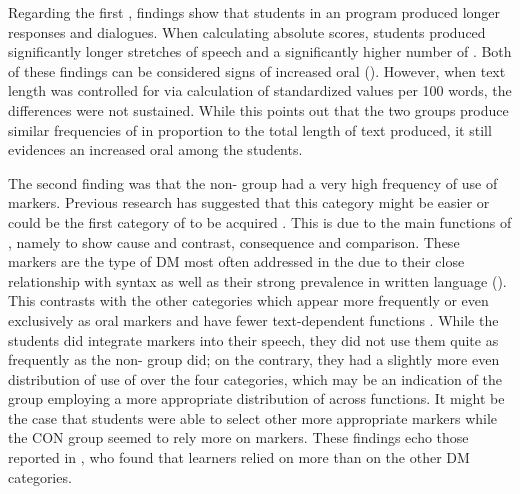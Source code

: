 \documentclass[output=paper]{langsci/langscibook}
\begin{document}
Regarding the first , findings show that students in an  program produced longer responses and dialogues. When calculating absolute scores,  students produced significantly longer stretches of speech and a significantly higher number of . Both of these findings can be considered signs of increased oral  (\citealt{SegalowitzFreed2004}). However, when text length was controlled for via calculation of standardized values per 100 words, the differences were not sustained. While this points out that the two groups produce similar frequencies of  in proportion to the total length of text produced, it still evidences an increased oral  among the  students.

The second finding was that the non- group had a very high frequency of use of  markers. Previous research has suggested that this category might be easier or could be the first category of  to be acquired \citep{Liu2016}. This is due to the main functions of  , namely to show cause and contrast, consequence and comparison. These markers are the type of DM most often addressed in the  due to their close relationship with syntax  as well as their strong prevalence in written language (\citealt{FungCarter2007}). This contrasts with the other categories which appear more frequently or even exclusively as oral markers and have fewer text-dependent functions \citep{Andersen2001}. While the  students did integrate  markers into their speech, they did not use them quite as frequently as the non- group did; on the contrary, they had a slightly more even distribution of use of  over the four categories, which may be an indication of the  group employing a more appropriate distribution of  across functions. It might be the case that  students were able to select other more appropriate markers while the CON group seemed to rely more on  markers. These findings echo those reported in \citet{FungCarter2007}, who found that  learners relied on   more than on the other DM categories. 
\end{document}
